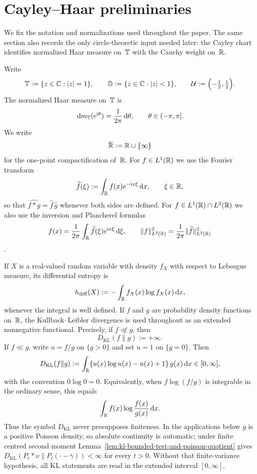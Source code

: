 \section{Cayley--Haar preliminaries}%
\label{sec:preliminaries}

We fix the notation and normalizations used throughout the paper.  The
same section also records the only circle-theoretic input needed later:
the Cayley chart identifies normalized Haar measure on~$\mathbb{T}$ with the
Cauchy weight on~$\mathbb{R}$.

Write
\[
\mathbb{T}:=\{z\in\mathbb{C}:\lvert z\rvert=1\},\qquad
\mathbb{D}:=\{z\in\mathbb{C}:\lvert z\rvert<1\},\qquad
\mathcal{U}:=\Bigl(-\tfrac12,\tfrac12\Bigr).
\]
The normalized Haar measure on~$\mathbb{T}$ is
\[
\,\mathrm{d} m_{\mathbb{T}}(e^{\mathrm{i}\theta})=\frac{1}{2\pi}\,\mathrm{d}\theta,
\qquad
\theta\in(-\pi,\pi].
\]
We write
\[
\overline{\mathbb{R}}:=\mathbb{R}\cup\{\infty\}
\]
for the one-point compactification of~$\mathbb{R}$.  For $f\in L^{1}(\mathbb{R})$ we
use the Fourier transform
\[
\widehat f(\xi):=\int_{\mathbb{R}}f(x)e^{-\mathrm{i} x\xi}\,\mathrm{d} x,
\qquad \xi\in\mathbb{R},
\]
so that $\widehat{f*g}=\widehat f\,\widehat g$ whenever both sides are
defined.
For $f\in L^{1}(\mathbb{R})\cap L^{2}(\mathbb{R})$ we also use the inversion and
Plancherel formulas
\[
f(x)=\frac{1}{2\pi}\int_{\mathbb{R}}\widehat f(\xi)e^{\mathrm{i} x\xi}\,\mathrm{d}\xi,
\qquad
\|f\|_{L^2(\mathbb{R})}^{2}=\frac{1}{2\pi}\|\widehat f\|_{L^2(\mathbb{R})}^{2}
\]
\cite[Chapter~I]{Stein1971}.

If $X$ is a real-valued random variable with density $f_X$ with respect
to Lebesgue measure, its differential entropy is
\[
h_{\mathrm{diff}}(X):=-\int_{\mathbb{R}}f_X(x)\log f_X(x)\,\mathrm{d} x,
\]
whenever the integral is well defined.  If $f$ and $g$ are probability
density functions on~$\mathbb{R}$, the Kullback--Leibler divergence
\cite{KullbackLeibler1951,CoverThomas2006} is used throughout as an
extended nonnegative functional.  Precisely, if \(f\not\ll g\), then
\[
D_{\mathrm{KL}}(f\|g):=+\infty .
\]
If \(f\ll g\), write \(u=f/g\) on \(\{g>0\}\) and set \(u=1\) on
\(\{g=0\}\).  Then
\begin{equation}\label{eq:extended-kl-definition}
D_{\mathrm{KL}}(f\|g)
:=\int_{\mathbb{R}}\{u(x)\log u(x)-u(x)+1\}\,g(x)\,\mathrm{d} x
\in[0,\infty],
\end{equation}
with the convention \(0\log0=0\).  Equivalently, when
\(f\log(f/g)\) is integrable in the ordinary sense, this equals
\[
\int_{\mathbb{R}}f(x)\log\frac{f(x)}{g(x)}\,\mathrm{d} x .
\]
Thus the symbol \(D_{\mathrm{KL}}\) never presupposes finiteness.  In the
applications below \(g\) is a positive Poisson density, so absolute
continuity is automatic; under finite centred second moment
Lemma~\ref{lem:kl-bounded-test-and-poisson-quotient} gives
\(D_{\mathrm{KL}}(P_t*\nu\|P_t(\cdot-\bar{\gamma}))<\infty\) for every
\(t>0\).  Without that finite-variance hypothesis, all KL statements are
read in the extended interval \([0,\infty]\).

